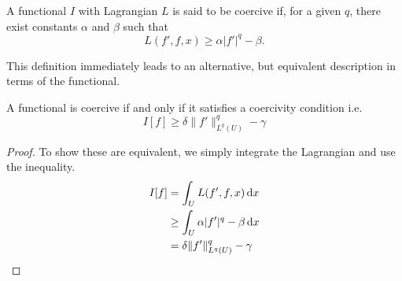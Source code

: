 \begin{definition}\label{def:coercive}
    A functional \(I\) with Lagrangian \(L\) is said to be coercive if, for a
    given \(q\), there exist constants \(\alpha\) and \(\beta\) such that
    \begin{equation}
        L(f', f, x) \geq \alpha |f'|^q - \beta.
    \end{equation}
\end{definition}
This definition immediately leads to an alternative, but equivalent description
in terms of the functional.
\begin{lemma}
    A functional is coercive if and only if it satisfies a coercivity condition
    i.e.
    \begin{equation}
        I[f] \geq \delta \|f'\|^q_{L^q(U)} - \gamma
    \end{equation}
\end{lemma}
\begin{proof}
    To show these are equivalent, we simply integrate the Lagrangian and use the
    inequality.
    \begin{align*}
        I[f] & = \int_U L(f',f,x)\dd{x} \\
             & \geq \int_U \alpha |f'|^q - \beta \dd{x} \\
             & = \delta\|f'\|_{L^q(U)}^q - \gamma \qedhere
    \end{align*}
\end{proof}
